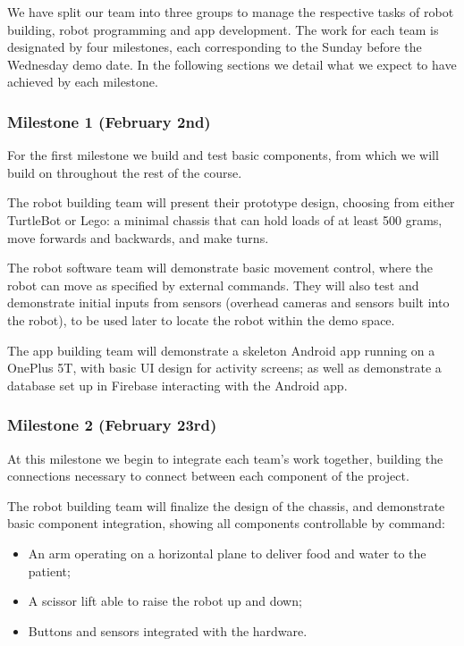 \documentclass{article}
\begin{document}
We have split our team into three groups to manage the respective tasks of robot building, robot programming and app development. The work for each team is designated by four milestones, each corresponding to the Sunday before the Wednesday demo date. In the following sections we detail what we expect to have achieved by each milestone. 

\subsubsection{Milestone 1 (February 2nd)}
For the first milestone we build and test basic components, from which we will build on throughout the rest of the course. 

The robot building team will present their prototype design, choosing from either TurtleBot or Lego: a minimal chassis that can hold loads of at least 500 grams, move forwards and backwards, and make turns.

The robot software team will demonstrate basic movement control, where the robot can move as specified by external commands. They will also test and demonstrate initial inputs from sensors (overhead cameras and sensors built into the robot), to be used later to locate the robot within the demo space.

The app building team will demonstrate a skeleton Android app running on a OnePlus 5T, with basic UI design for activity screens; as well as demonstrate a database set up in Firebase interacting with the Android app. 

\subsubsection{Milestone 2 (February 23rd)}
At this milestone we begin to integrate each team's work together, building the connections necessary to connect between each component of the project. 

The robot building team will finalize the design of the chassis, and demonstrate basic component integration, showing all components controllable by command:
\begin{itemize}
\item An arm operating on a horizontal plane to deliver food and water to the patient;
\item A scissor lift able to raise the robot up and down;
\item Buttons and sensors integrated with the hardware.
\end{itemize}
\end{document}
